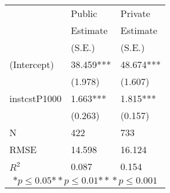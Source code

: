 \begin{tabular}{*{3}{l}}
\hline
                  & Public & Private   \tabularnewline
                   &Estimate   &Estimate \tabularnewline
                 &(S.E.)   &(S.E.) \tabularnewline
 \hline
 \hline
   (Intercept)     &38.459*** &48.674*** \tabularnewline
                 &(1.978)   &(1.607)  \tabularnewline
   instcstP1000    &1.663*** &1.815*** \tabularnewline
                 &(0.263)   &(0.157)  \tabularnewline
 \hline
 N                 &422       &733       \tabularnewline
 RMSE             &14.598   &16.124   \tabularnewline
 $R^2$             &0.087   &0.154   \tabularnewline
 \hline
\hline
 
 \multicolumn{3}{c}{${*  p}\le 0.05$${*\!\!*  p}\le 0.01$${*\!\!*\!\!*  p}\le 0.001$}\tabularnewline
 \end{tabular}